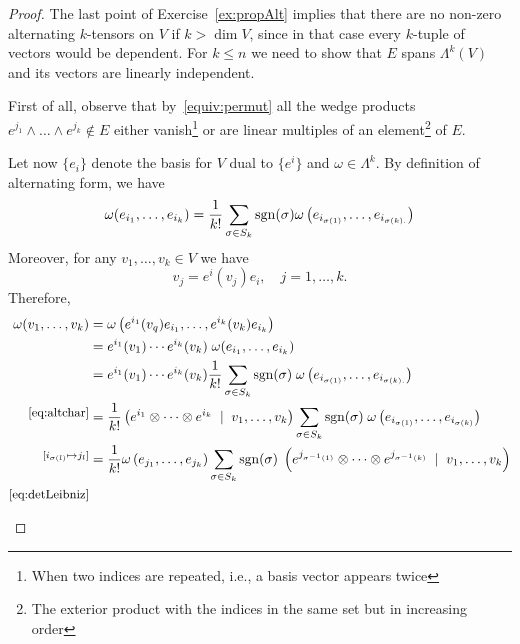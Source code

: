 \begin{proof}
  The last point of Exercise~\ref{ex:propAlt} implies that there are no non-zero alternating $k$-tensors on $V$ if $k >\dim V$, since in that case every $k$-tuple of vectors would be dependent.
  For $k\leq n$ we need to show that $E$ spans $\Lambda^k(V)$ and its vectors are linearly independent.

  First of all, observe that by~\eqref{equiv:permut} all the wedge products ${e^{j_1}\wedge\ldots\wedge e^{j_k}\not\in E}$ either vanish\footnote{When two indices are repeated, i.e., a basis vector appears twice} or are linear multiples of an element\footnote{The exterior product with the indices in the same set but in increasing order} of $E$.

  Let now $\{e_i\}$ denote the basis for $V$ dual to $\{e^i\}$ and $\omega\in\Lambda^k$.
  By definition of alternating form, we have
  \begin{equation}\label{eq:altchar}
    \omega(e_{i_1}, \ldots, e_{i_k}) = \frac1{k!} \sum_{\sigma\in S_k}\operatorname{sgn}(\sigma) \omega\left(e_{i_{\sigma(1)}}, \ldots, e_{i_{\sigma(k).}}\right)
  \end{equation}
  Moreover, for any $v_1,\ldots,v_k\in V$ we have
  \begin{equation}
    v_j = e^i(v_j) e_i, \quad j=1,\ldots, k.
  \end{equation}
  Therefore,
  \begin{align}
    \omega(v_1, \ldots, v_k)
    &=\omega\left(e^{i_1}(v_q) e_{i_1}, \ldots, e^{i_k}(v_k) e_{i_k}\right)\\
    &=e^{i_1}(v_1)\cdots e^{i_k}(v_k)\; \omega(e_{i_1}, \ldots, e_{i_k})\\
    &=e^{i_1}(v_1)\cdots e^{i_k}(v_k) \frac1{k!} \sum_{\sigma\in S_k}\sgn(\sigma)\; \omega\left(e_{i_{\sigma(1)}}, \ldots, e_{i_{\sigma(k).}}\right) \\
    \overset{\mbox{\small\eqref{eq:altchar}}}{}
    &= \frac1{k!} \left(e^{i_1}\otimes \cdots \otimes e^{i_k} \;\mid\; v_1, \ldots, v_k\right) \sum_{\sigma\in S_k}\sgn(\sigma)\; \omega\left(e_{i_{\sigma(1)}}, \ldots, e_{i_{\sigma(k)}}\right) \\
    \overset{[i_{\sigma(l)} \mapsto j_l]}{}
    &= \frac1{k!} \omega\left(e_{j_1}, \ldots, e_{j_k}\right) \sum_{\sigma\in S_k} \sgn(\sigma) \;\left(e^{j_{\sigma^{-1}(1)}}\otimes \cdots \otimes e^{j_{\sigma^{-1}(k)}} \;\mid\; v_1, \ldots, v_k\right)\\
    \overset{\mbox{\small\eqref{eq:detLeibniz}}}{}

\end{align}
\end{proof}
